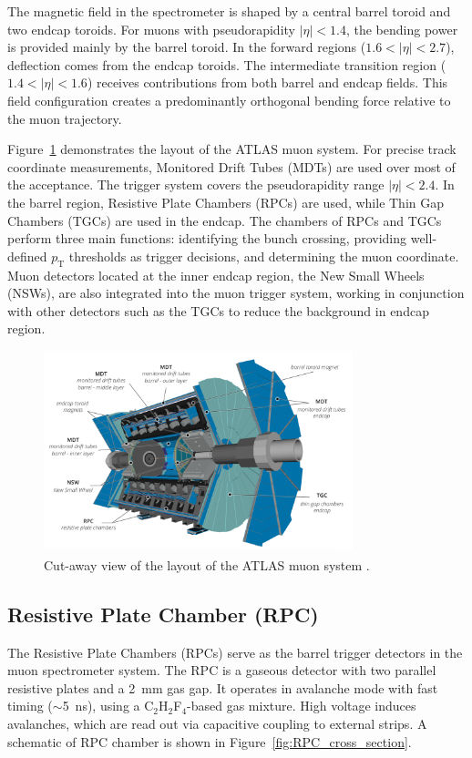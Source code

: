 The magnetic field in the spectrometer is shaped by a central barrel toroid and two endcap toroids. For muons with pseudorapidity $|\eta| < 1.4$, the bending power is provided mainly by the barrel toroid. In the forward regions ($1.6 < |\eta| < 2.7$), deflection comes from the endcap toroids. The intermediate transition region ($1.4 < |\eta| < 1.6$) receives contributions from both barrel and endcap fields. This field configuration creates a predominantly orthogonal bending force relative to the muon trajectory. 

Figure~\ref{fig:muon_system} demonstrates the layout of the ATLAS muon system. For precise track coordinate measurements, Monitored Drift Tubes ({MDT}s) are used over most of the acceptance. The trigger system covers the pseudorapidity range $|\eta| < 2.4$. In the barrel region, Resistive Plate Chambers ({RPC}s) are used, while Thin Gap Chambers ({TGC}s) are used in the endcap. The chambers of RPCs and TGCs perform three main functions: identifying the bunch crossing, providing well-defined $p_\mathrm{T}$ thresholds as trigger decisions, and determining the muon coordinate. Muon detectors located at the inner endcap region, the New Small Wheels ({NSW}s), are also integrated into the muon trigger system, working in conjunction with other detectors such as the TGCs to reduce the background in endcap region.

\begin{figure}[htbp]
  \centering
  \includegraphics[width=0.8\textwidth]{figs/chapter2/muon_system.png}
  \caption{Cut-away view of the layout of the ATLAS muon system \cite{ATLASRun3Detector}.}
  \label{fig:muon_system}
\end{figure}

\subsection{Resistive Plate Chamber (RPC)}
The Resistive Plate Chambers (RPCs) serve as the barrel trigger detectors in the muon spectrometer system. The RPC is a gaseous detector with two parallel resistive plates and a 2~mm gas gap. It operates in avalanche mode with fast timing ($\sim$5~ns), using a C$_2$H$_2$F$_4$-based gas mixture. High voltage induces avalanches, which are read out via capacitive coupling to external strips. A schematic of RPC chamber is shown in Figure~\ref{fig:RPC_cross_section}.

